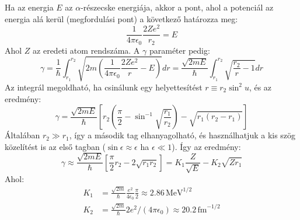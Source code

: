\documentclass[../main.tex]{subfiles}
\begin{document}
Ha az energia $E$ az $\alpha$-részecske energiája, akkor a pont, ahol a potenciál az energia alá kerül (megfordulási pont) a következő határozza meg:
\begin{equation}
    \frac{1}{4\pi \epsilon_0} \frac{2Ze^2}{r_2} = E 
\end{equation}
Ahol $Z$ az eredeti atom rendszáma. A $\gamma$ paraméter pedig:
\begin{equation}
    \gamma = \frac{1}{\hbar} \int_{r_1}^{r_2} \sqrt{2m \left(\frac{1}{4\pi \epsilon_0} \frac{2Ze^2}{r} - E\right)} dr = \frac{\sqrt{2mE}}{\hbar} \int_{r_1}^{r_2} \sqrt{\frac{r_2}{r} - 1} dr
\end{equation}
Az integrál megoldható, ha csinálunk egy helyettesítést $r \equiv r_2 \sin^2 u$, és az eredmény:
\begin{equation}
    \gamma = \frac{\sqrt{2mE}}{\hbar} \left[r_2 \left(\frac{\pi}{2} - \sin^{-1} \sqrt{\frac{r_1}{r_2}}\right) - \sqrt{r_1 (r_2 - r_1)} \right]
\end{equation}
Általában $r_2 \gg r_1$, így a második tag elhanyagolható, és használhatjuk a kis szög közelítést is az első tagban ($\sin \epsilon \approx \epsilon$ ha $\epsilon \ll 1$). Így az eredmény:
\begin{equation}
    \gamma \approx \frac{\sqrt{2mE}}{\hbar} \left[\frac{\pi}{2}r_2 - 2 \sqrt{r_1 r_2}\right] = K_1 \frac{Z}{\sqrt{E}} - K_2 \sqrt{Z r_1}
\end{equation}
Ahol:
\begin{equation}
    \begin{aligned}
        K_1 & = \frac{\sqrt{2m}}{\hbar} \frac{e^2}{4 \epsilon_0} \frac{\pi}{2} \approx 2.86 \, \text{MeV}^{1/2} \\
        K_2 & = \frac{\sqrt{2m}}{\hbar} 2 e^2 / (4 \pi \epsilon_0) \approx 20.2 \, \text{fm}^{-1/2}
    \end{aligned}
\end{equation}
\end{document}

